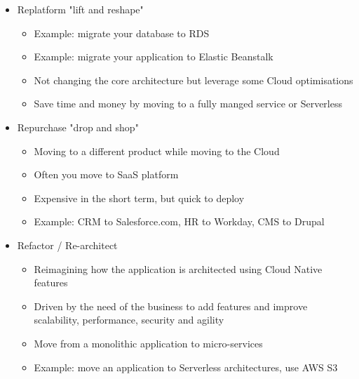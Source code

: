 \begin{itemize}
\begin{itemize}
        \item Cloud save as much as 30\% on cost
        \item Example: Migrate using AWS application migration service
    \end{itemize}
    \item Replatform "lift and reshape"
    \begin{itemize}
        \item Example: migrate your database to RDS
        \item Example: migrate your application to Elastic Beanstalk
        \item Not changing the core architecture but leverage some Cloud optimisations
        \item Save time and money by moving to a fully manged service or Serverless
    \end{itemize}
    \item Repurchase "drop and shop"
    \begin{itemize}
        \item Moving to a different product while moving to the Cloud
        \item Often you move to SaaS platform
        \item Expensive in the short term, but quick to deploy
        \item Example: CRM to Salesforce.com, HR to Workday, CMS to Drupal
    \end{itemize}
    \item Refactor / Re-architect
    \begin{itemize}
        \item Reimagining how the application is architected using Cloud Native features
        \item Driven by the need of the business to add features and improve scalability, performance, security and agility
        \item Move from a monolithic application to micro-services
        \item Example: move an application to Serverless architectures, use AWS S3
    \end{itemize}
\end{itemize}


